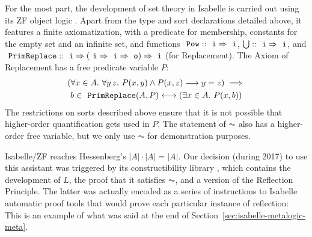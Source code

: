 For the most part, the development of set theory in Isabelle is
carried out using its ZF object logic
\cite{DBLP:journals/jar/PaulsonG96}. Apart from the type and sort
declarations detailed above, it features a finite axiomatization,
with a predicate for membership, constants for the empty set and an
infinite set, and functions $\isatt{Pow}::\tyi\fun\tyi$,
$\union::\tyi\fun\tyi$, and $\isatt{PrimReplace} :: \tyi \fun (\tyi
\fun \tyi \fun\tyo)\fun \tyi$ (for Replacement). The Axiom of
Replacement
has a free predicate variable $P$: %
\begin{multline*}
  (\forall x \in A .\ \forall y\, z.\ P(x, y) \wedge P(x, z)
  \longrightarrow y=z) \implies \\
  b \in \isatt{PrimReplace}(A, P)
  \longleftrightarrow(\exists x \in A .\ P(x, b)) 
\end{multline*}
The restrictions on sorts described above ensure that it is not
possible that higher-order quantification gets used in $P$. The
statement of $\AC$ also has a higher-order free variable, but we only
use $\AC$ for demonstration purposes.

Isabelle/ZF reaches Hessenberg's $|A|\cdot|A| = |A|$. Our decision
(during 2017) to
use this assistant was triggered by its constructibility
library \citep{paulson_2003},
which contains the development of $L$, the proof that it satisfies
$\AC$, and a version of the Reflection Principle. The latter was
actually encoded as a series of instructions to Isabelle automatic
proof tools that would prove each particular instance of reflection:
This is an example of what was said at the end of Section~\ref{sec:isabelle-metalogic-meta}.

